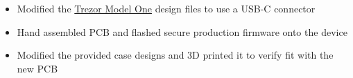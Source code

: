 \documentclass{resume}
\begin{document}
\begin{itemize}
    \item Modified the \href{https://shop.trezor.io/product/trezor-one-white}{Trezor Model One} design files to use a USB-C connector
    \item Hand assembled PCB and flashed secure production firmware onto the device
    \item Modified the provided case designs and 3D printed it to verify fit with the new PCB
\end{itemize}

\Education

\end{document}
